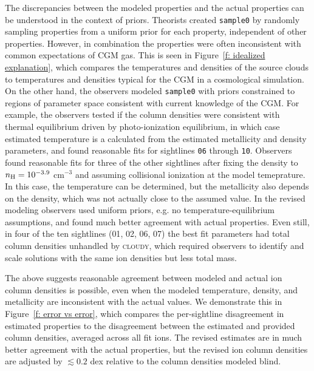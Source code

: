 \documentclass[fleqn,usenatbib]{mnras}
\begin{document}
The discrepancies between the modeled properties and the actual properties can be understood in the context of priors.
Theorists created \texttt{sample0} by randomly sampling properties from a uniform prior for each property, independent of other properties.
However, in combination the properties were often inconsistent with common expectations of CGM gas.
This is seen in Figure~\ref{f: idealized explanation}, which compares the temperatures and densities of the source clouds to temperatures and densities typical for the CGM in a cosmological simulation.
On the other hand, the observers modeled \texttt{sample0} with priors constrained to regions of parameter space consistent with current knowledge of the CGM.
For example, the observers tested if the column densities were consistent with thermal equilibrium driven by photo-ionization equilibrium, in which case estimated temperature is a calculated from the estimated metallicity and density parameters, and found reasonable fits for sightlines \texttt{06} through \texttt{10}.
Observers found reasonable fits for three of the other sightlines after fixing the density to $n_{\rm H} = 10^{-3.9}$ cm$^{-3}$ and assuming collisional ionization at the model temeprature.
In this case, the temperature can be determined, but the metallicity also depends on the density,
which was not actually close to the assumed value.
In the revised modeling observers used uniform priors, e.g. no temperature-equilibrium assumptions, and found much better agreement with actual properties.
Even still, in four of the ten sightlines (\textsc{01}, \textsc{02}, \textsc{06}, \textsc{07}) the best fit parameters had total  column densities unhandled by \textsc{cloudy}, which required observers to identify and scale solutions with the same ion densities but less total mass.

The above suggests reasonable agreement between modeled and actual ion column densities is possible, even when the modeled temperature, density, and metallicity are inconsistent with the actual values.
We demonstrate this in Figure~\ref{f: error vs error},
which compares the per-sightline disagreement in estimated properties to the disagreement between the estimated and provided column densities, averaged across all fit ions. 
The revised estimates are in much better agreement with the actual properties, but the revised ion column densities are adjusted by $\lesssim 0.2$ dex relative to the column densities modeled blind.
\end{document}
